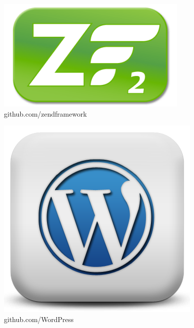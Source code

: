 \begin{frame}
\begin{columns}
    \begin{column}{4.5cm}
        \begin{figure}
            \includegraphics[scale=0.2]{img/zend2.png} 
            \caption{github.com/zendframework}
        \end{figure}
        \begin{figure}
            \includegraphics[scale=0.15]{img/wordpress.png} 
            \caption{github.com/WordPress}
        \end{figure}
    \end{column}

\end{columns}

\end{frame}

